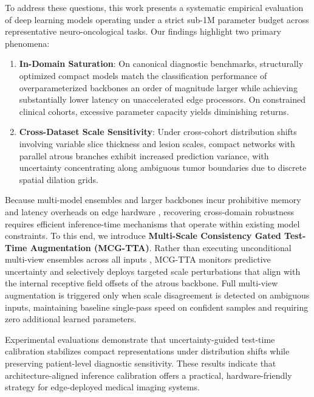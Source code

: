 To address these questions, this work presents a systematic empirical evaluation of deep learning models operating under a strict sub-1M parameter budget across representative neuro-oncological tasks. Our findings highlight two primary phenomena:
\begin{enumerate}
\item \textbf{In-Domain Saturation}: On canonical diagnostic benchmarks, structurally optimized compact models match the classification performance of overparameterized backbones an order of magnitude larger while achieving substantially lower latency on unaccelerated edge processors. On constrained clinical cohorts, excessive parameter capacity yields diminishing returns.
\item \textbf{Cross-Dataset Scale Sensitivity}: Under cross-cohort distribution shifts involving variable slice thickness and lesion scales, compact networks with parallel atrous branches exhibit increased prediction variance, with uncertainty concentrating along ambiguous tumor boundaries due to discrete spatial dilation grids.
\end{enumerate}

Because multi-model ensembles and larger backbones incur prohibitive memory and latency overheads on edge hardware \cite{9, 16}, recovering cross-domain robustness requires efficient inference-time mechanisms that operate within existing model constraints. To this end, we introduce \textbf{Multi-Scale Consistency Gated Test-Time Augmentation (MCG-TTA)}. Rather than executing unconditional multi-view ensembles across all inputs \cite{4, 35}, MCG-TTA monitors predictive uncertainty and selectively deploys targeted scale perturbations that align with the internal receptive field offsets of the atrous backbone. Full multi-view augmentation is triggered only when scale disagreement is detected on ambiguous inputs, maintaining baseline single-pass speed on confident samples and requiring zero additional learned parameters.

Experimental evaluations demonstrate that uncertainty-guided test-time calibration stabilizes compact representations under distribution shifts while preserving patient-level diagnostic sensitivity. These results indicate that architecture-aligned inference calibration offers a practical, hardware-friendly strategy for edge-deployed medical imaging systems.

